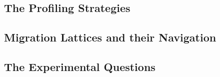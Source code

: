 \subsection{The Profiling Strategies}
\label{subsec:strategies}



\subsection{Migration Lattices and their Navigation}
\label{subsec:lattice}



\subsection{The Experimental Questions}
\label{subsec:questions}

